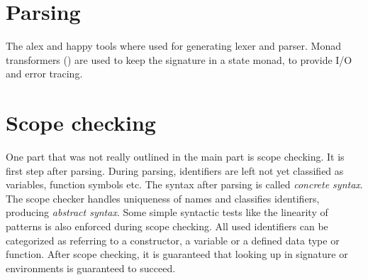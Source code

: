 \section{Parsing}
The alex \cite{alex} and happy \cite{happy} tools where used for generating lexer and parser.
Monad transformers (\cite{Grabmueller2006MonadTransformers}) are used to keep the signature in a state monad,
to provide I/O and error tracing.

\section{Scope checking}
One part that was not really outlined in the main part is scope checking.
It is first step after parsing.
During parsing, identifiers are left not yet classified as variables, function symbols etc.
The syntax after parsing is called \emph{concrete syntax}.
The scope checker handles uniqueness of names and classifies identifiers, producing \emph{abstract syntax}.
Some simple syntactic tests like the linearity of patterns is also enforced during scope checking.
All used identifiers can be categorized as referring to a constructor, a variable or a defined data type or
function. After scope checking, it is guaranteed that looking up in signature or environments is guaranteed to succeed.



